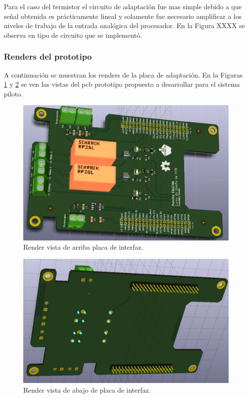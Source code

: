 Para el caso del termistor el circuito de adaptación fue mas simple debido a que señal obtenida es prácticamente lineal y solamente fue necesario amplificar a los niveles de trabajo de la entrada analógica del procesador. En la Figura XXXX se observa en tipo de circuito que se implementó.


\subsubsection{Renders del prototipo}

A continuación se muestran los renders de la placa de adaptación. En la Figuras \ref{fig:renderPonchoTOP} y \ref{fig:renderPonchoBOT} se ven las vistas del pcb prototipo propuesto a desarrollar para el sistema piloto. 

\begin{figure}[h!]
	\centering
	\includegraphics[width=.9\textwidth]{Figures/Cap_3/tempRelayPoncho_TOP}
	\caption{Render vista de arriba placa de interfaz.}
	\label{fig:renderPonchoTOP}
\end{figure}

\begin{figure}[h!]
	\centering
	\includegraphics[width=.9\textwidth]{Figures/Cap_3/tempRelayPoncho_BOTTOM}
	\caption{Render vista de abajo de placa de interfaz.}
	\label{fig:renderPonchoBOT}
\end{figure}


